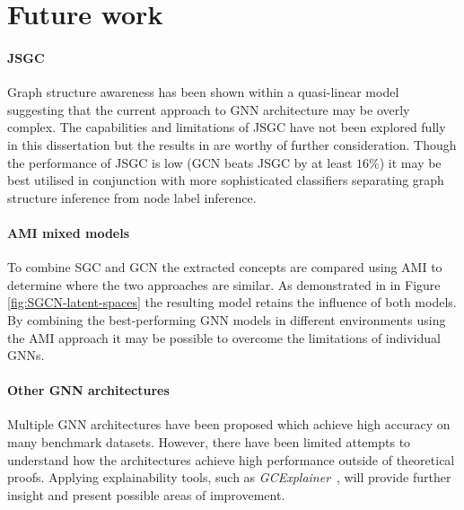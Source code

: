 \section{Future work}
\paragraph{JSGC}
Graph structure awareness has been shown within a quasi-linear model suggesting that the current approach to GNN architecture may be overly complex.
The capabilities and limitations of JSGC have not been explored fully in this dissertation but the results in  are worthy of further consideration.
Though the performance of JSGC is low (GCN beats JSGC by at least $16\%$) it may be best utilised in conjunction with more sophisticated classifiers separating graph structure inference from node label inference.

\paragraph{AMI mixed models}
To combine SGC and GCN the extracted concepts are compared using AMI to determine where the two approaches are similar.
As demonstrated in  in Figure \ref{fig:SGCN-latent-spaces} the resulting model retains the influence of both models.
By combining the best-performing GNN models in different environments using the AMI approach it may be possible to overcome the limitations of individual GNNs.

\paragraph{Other GNN architectures}
Multiple GNN architectures have been proposed which achieve high accuracy on many benchmark datasets.
However, there have been limited attempts to understand how the architectures achieve high performance outside of theoretical proofs.
Applying explainability tools, such as \textit{GCExplainer}~\cite{magister2021gcexplainer}, will provide further insight and present possible areas of improvement.
